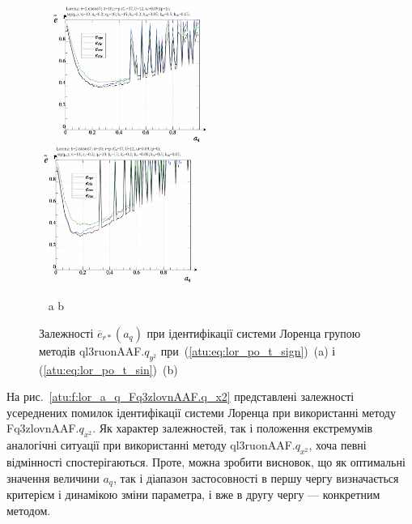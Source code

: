 \begin{figure}[ht!]
  \begin{center}
    ~ \hfill
    \includegraphics[width=0.49\textwidth]{p/cha/lor/ql3ruonAAF/lor_ql3ruonAAF_qy2-p_a_q_e_sign.png}
    \hfill
    \includegraphics[width=0.49\textwidth]{p/cha/lor/ql3ruonAAF/lor_ql3ruonAAF_qy2-p_a_q_e_sin.png}
    \hfill ~
  \end{center}
  \vspace{-1.0ex}
  \begin{center}
    ~ \hfill a \hfill\hfill b \hfill ~
  \end{center}
  \vspace{-1.5ex}
  \caption{Залежності $ \overline{e}_{r *} (a_q) $ при ідентифікації системи Лоренца групою методів ql3ruonAAF.$q_{y^2} $ при~(\ref{atu:eq:lor_po_t_sign})~(a) і (\ref{atu:eq:lor_po_t_sin})~(b)}
  \label{atu:f:lor_a_q_ql3ruonAAF.q_y2}
\end{figure}


На рис.~\ref{atu:f:lor_a_q_Fq3zlovnAAF.q_x2} представлені залежності усереднених
помилок ідентифікації системи Лоренца при використанні методу
Fq3zlovnAAF.$q_{x^2}$.
Як характер залежностей, так і положення екстремумів аналогічні
ситуації при використанні методу
ql3ruonAAF.$q_{x^2}$,
хоча певні відмінності спостерігаються. Проте, можна зробити
висновок, що як оптимальні значення величини
$a_q$, так і діапазон застосовності в першу чергу визначається
критерієм і динамікою зміни параметра, і вже в другу чергу ---
конкретним методом.


